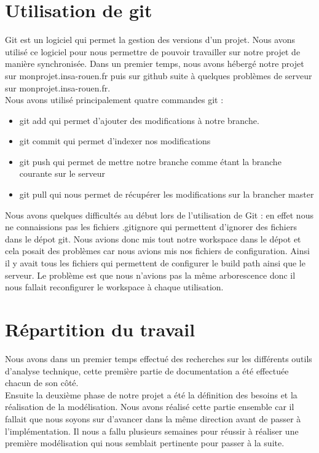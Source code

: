 \section{Utilisation de git}
Git est un logiciel qui permet la gestion des versions d'un projet. Nous avons utilisé ce logiciel pour nous permettre de pouvoir travailler sur notre projet de manière synchronisée. Dans un premier temps, nous avons hébergé notre projet sur monprojet.insa-rouen.fr puis sur github suite à quelques problèmes de serveur sur monprojet.insa-rouen.fr. \\

Nous avons utilisé principalement quatre commandes git : 
\begin{itemize}
\item git add qui permet d'ajouter des modifications à notre branche. 
\item git commit qui permet d'indexer nos modifications
\item git push qui permet de mettre notre branche comme étant la branche courante sur le serveur
\item git pull qui nous permet de récupérer les modifications sur la brancher master
\end{itemize}

Nous avons quelques difficultés au début lors de l'utilisation de Git : en effet nous ne connaissions pas les fichiers .gitignore qui permettent d'ignorer des fichiers dans le dépot git. Nous avions donc mis tout notre workspace dans le dépot et cela posait des problèmes car nous avions mis nos fichiers de configuration. Ainsi il y avait tous les fichiers qui permettent de configurer le build path ainsi que le serveur. Le problème est que nous n'avions pas la même arborescence donc il nous fallait reconfigurer le workspace à chaque utilisation. 


\section{Répartition du travail}

Nous avons dans un premier temps effectué des recherches sur les différents outils d'analyse technique, cette première partie de documentation a été effectuée chacun de son côté. \\

Ensuite la deuxième phase de notre projet a été la définition des besoins et la réalisation de la modélisation. Nous avons réalisé cette partie ensemble car il fallait que nous soyons sur d'avancer dans la même direction avant de passer à l'implémentation. Il nous a fallu plusieurs semaines pour réussir à réaliser une première modélisation qui nous semblait pertinente pour passer à la suite. \\

